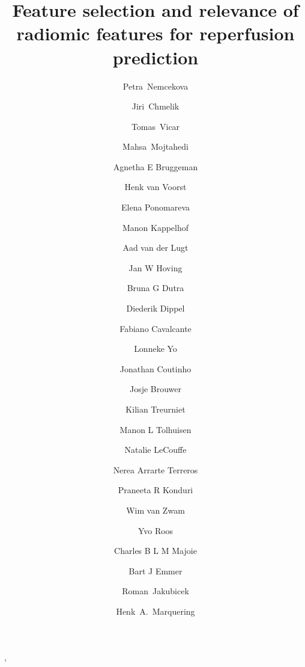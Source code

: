 \documentclass[preprint,12pt]{elsarticle}
\begin{document}
\begin{frontmatter}



\title{Feature selection and relevance of radiomic features for reperfusion prediction}


\author[FEEC]{Petra~Nemcekova}
\author[FEEC]{Jiri~Chmelik}
\author[FEEC]{Tomas~Vicar}
\author[UMC]{Mahsa~Mojtahedi}
\author[DRUMC]{Agnetha E Bruggeman},
\author[UMC]{Henk van Voorst}
\author[NICOLAB]{Elena Ponomareva}
\author[DRUMC]{Manon Kappelhof}
\author[DRNM]{Aad van der Lugt}
\author[DRUMC]{Jan W Hoving}
\author[DRUMC]{Bruna G Dutra}
\author[DN]{Diederik Dippel}
\author[DRUMC]{Fabiano Cavalcante}
\author[DRCZ]{Lonneke Yo}
\author[DNUMC]{Jonathan Coutinho}
\author[DNUMC]{Josje Brouwer}
\author[RBRNM, DRH]{Kilian Treurniet}
\author[UMC]{Manon L Tolhuisen}
\author[DNUMC]{Natalie LeCouffe}
\author[UMC, DRUMC]{Nerea Arrarte Terreros}
\author[UMC, DRUMC]{Praneeta R Konduri}
\author[DRNMM]{Wim van Zwam}
\author[DNUMC]{Yvo Roos}
\author[DRUMC]{Charles B L M Majoie}
\author[DRUMC]{Bart J Emmer}
\author[FEEC]{Roman~Jakubicek} 
\author[UMC]{Henk~A.~Marquering}


\end{frontmatter}
\end{document}
